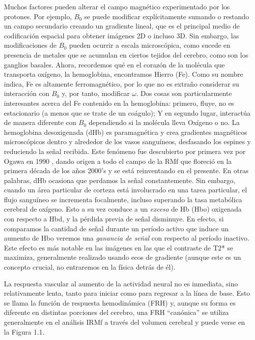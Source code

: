 \documentclass[12pt,a5,twoside]{book}
\begin{document}
Muchos factores pueden alterar el campo magnético experimentado por los protones. Por ejemplo, \(B_{0}\) se puede modificar explícitamente sumando o restando un campo secundario creando un gradiente lineal, que es el principal medio de codificación espacial para obtener imágenes 2D o incluso 3D. Sin embargo, las modificaciones de \(B_{0}\) pueden ocurrir a escala microscópica, como sucede en presencia de metales que se acumulan en ciertos tejidos del cerebro, como son los ganglios basales. Ahora, recordemos qué en el corazón de la molécula que transporta oxígeno, la hemoglobina, encontramos Hierro (Fe). Como su nombre indica, Fe es altamente ferromagnético, por lo que no es extraño considerar su interacción con \(B_{0}\) y, por tanto, modificar \(\omega\). Dos cosas son particularmente interesantes acerca del Fe contenido en la hemoglobina: primero, fluye, no es estacionario (a menos que se trate de un coágulo); Y en segundo lugar, interactúa de manera diferente con \(B_{0}\) dependiendo si la molécula lleva Oxígeno o no. La hemoglobina desoxigenada (dHb) es paramagnética y crea gradientes magnéticos microscópicos dentro y alrededor de los vasos sanguíneos, desfasando los espines y reduciendo la señal recibida. Este fenómeno fue descubierto por primera vez por Ogawa en 1990 \citep{OgawaS1990}, dando origen a todo el campo de la RMf que floreció en la primera década de los años 2000's y se está reinventando en el presente. En otras palabras, dHb ocasiona que perdamos la señal constantemente. Sin embargo, cuando un área particular de corteza está involucrado en una tarea particular, el flujo sanguíneo se incrementa focalmente, incluso superando la tasa metabólica cerebral de oxígeno.
Esto a su vez conduce a un {\it exceso} de Hb (Hbo) oxigenada con respecto a Hbd, y la pérdida previa de señal disminuye. En efecto, si comparamos la cantidad de señal durante un período activo que induce un aumento de Hbo veremos una {\it ganancia de señal} con respecto al período inactivo. Este efecto es más notable en las imágenes en las que el contraste de T2* se maximiza, generalmente realizado usando ecos de gradiente (aunque este es un concepto crucial, no entraremos en la física detrás de él). 

La respuesta vascular al aumento de la actividad neural no es inmediata, sino relativamente lenta, tanto para iniciar como para regresar a la línea de base. Esto se llama la función de respuesta hemodinámica (FRH) y, aunque su forma es diferente en distintas porciones del cerebro, una FRH ``canónica'' se utiliza generalmente en el análisis IRMf a través del volumen cerebral y puede verse en la Figura 1.1. 
\end{document}
